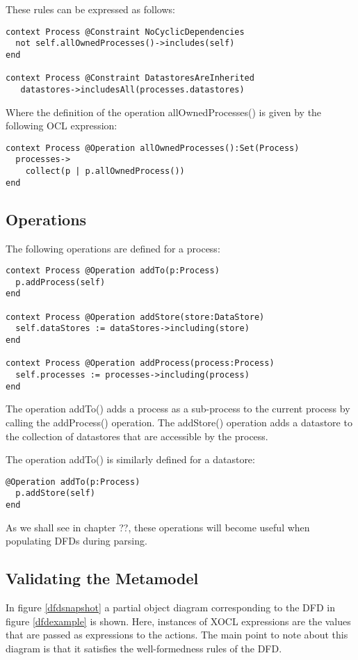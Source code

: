 \noindent These rules can be expressed as follows:


\begin{lstlisting}
context Process @Constraint NoCyclicDependencies
  not self.allOwnedProcesses()->includes(self)
end

context Process @Constraint DatastoresAreInherited
   datastores->includesAll(processes.datastores)
\end{lstlisting}
\noindent Where the definition of the operation allOwnedProcesses()
is given by the following OCL expression:


\begin{lstlisting}
context Process @Operation allOwnedProcesses():Set(Process)
  processes->
    collect(p | p.allOwnedProcess())
end
\end{lstlisting}
\subsection{Operations}

The following operations are defined for a process:


\begin{lstlisting}
context Process @Operation addTo(p:Process)
  p.addProcess(self)
end

context Process @Operation addStore(store:DataStore)
  self.dataStores := dataStores->including(store)
end

context Process @Operation addProcess(process:Process)
  self.processes := processes->including(process)
end
\end{lstlisting}
The operation addTo() adds a process as a sub-process to the
current process by calling the addProcess() operation. The
addStore() operation adds a datastore to the collection of
datastores that are accessible by the process.

The operation addTo() is similarly defined for a datastore:


\begin{lstlisting}
@Operation addTo(p:Process)
  p.addStore(self)
end
\end{lstlisting}
As we shall see in chapter ??, these operations will become useful
when populating DFDs during parsing.

\subsection{Validating the Metamodel}

In figure \ref{dfdsnapshot} a partial object diagram corresponding
to the DFD in figure \ref{dfdexample} is shown. Here, instances of
XOCL expressions are the values that are passed as expressions to
the actions. The main point to note about this diagram is that it
satisfies the well-formedness rules of the DFD.

